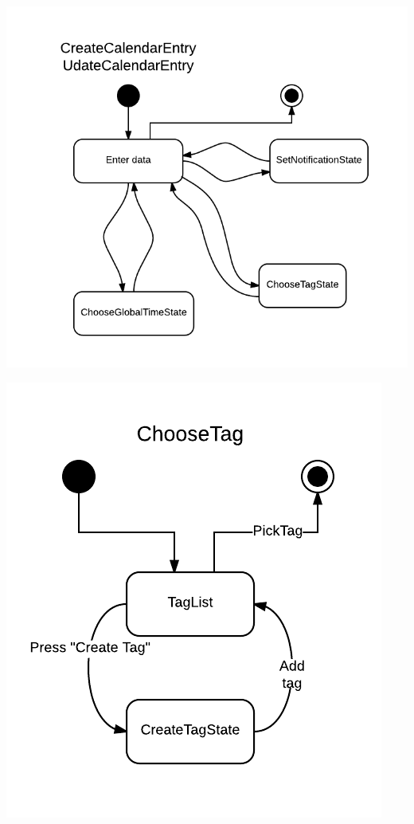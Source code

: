 \includegraphics[scale=0.5]{CreateUpdateEntry-StateDiagram}

\includegraphics[scale=0.6]{ChooseTag-StateDiagram}

